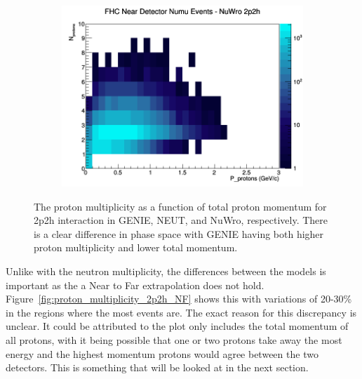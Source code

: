 \documentclass[12pt]{article}
\begin{document}
\begin{figure}[h]
\begin{subfigure}[b]{0.32\textwidth}
\includegraphics[width=\linewidth]{N_P/nominal/protons/2p2h_FHC_ND_numu_N_P_NuWro.png}
\end{subfigure}
\caption{The proton multiplicity as a function of total proton momentum for 2p2h interaction in GENIE, NEUT, and NuWro, respectively. There is a clear difference in phase space with GENIE having both higher proton multiplicity and lower total momentum.}
\label{fig:proton_multiplicity_2p2h}
\end{figure}

Unlike with the neutron multiplicity, the differences between the models is important as the a Near to Far extrapolation does not hold.  
Figure~\ref{fig:proton_multiplicity_2p2h_NF} shows this with variations of 20-30\% in the regions where the most events are.  
The exact reason for this discrepancy is unclear.
It could be attributed to the plot only includes the total momentum of all protons, with it being possible that one or two protons take away the most energy and the highest momentum protons would agree between the two detectors.
This is something that will be looked at in the next section.  
\end{document}
